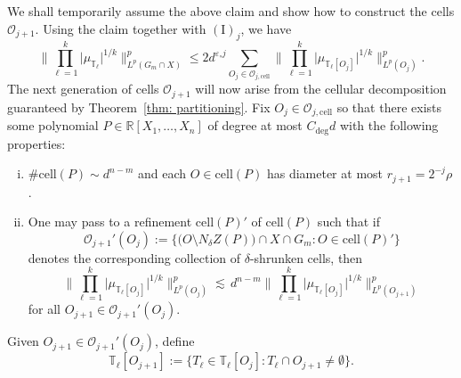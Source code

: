 \documentclass[reqno]{amsart}
\numberwithin{equation}{section}
\newcommand{\R}{\mathbb{R}}
\newcommand{\T}{\mathbb{T}}
\newcommand{\cO}{\mathcal{O}}
\theoremstyle{plain}
\theoremstyle{definition}
\newcommand{\cell}{\mathrm{cell}}
\begin{document}
We shall temporarily assume the above claim and show how to construct the cells $\cO_{j+1}$. Using the claim together with $(\mathrm{I})_j$, we have
 \begin{equation}\label{eq: cellular 1}
   \Big\|\prod_{\ell = 1}^k \big| \mu_{\T_{\ell}}  \big|^{1/k} \Big\|_{L^p(G_m\cap X)}^p \leq 2d^{\varepsilon_{\circ}j} \sum_{O_j \in \cO_{j,\cell}} \Big\|\prod_{\ell = 1}^k \big| \mu_{\T_{\ell}[O_j]} \big|^{1/k} \Big\|_{L^p(O_j)}^p.
\end{equation} 
The next generation of cells $\cO_{j+1}$ will now arise from the cellular decomposition guaranteed by Theorem~\ref{thm: partitioning}. Fix $O_j \in \cO_{j, \cell}$ so that there exists some polynomial $P \in \R[X_1, \dots, X_n]$ of degree at most $C_{\deg} d$ with the following properties:
\begin{enumerate}[i)]
    \item $\#\cell(P) \sim d^{n-m}$ and each $O \in \cell(P)$ has diameter at most $r_{j+1} = 2^{-j} \rho$. 
    \item One may pass to a refinement $\cell(P)'$ of $\cell(P)$ such that if 
    \begin{equation*}
        \cO_{j+1}'(O_j) := \big\{ \big(O\setminus N_{\delta}Z(P)\big) \cap X \cap G_m : O \in \cell(P)'\}
    \end{equation*}
    denotes the corresponding collection of $\delta$-shrunken cells, then 
    \begin{equation*}
    \Big\|\prod_{\ell = 1}^k \big| \mu_{\T_{\ell}[O_j]} \big|^{1/k} \Big\|_{L^p(O_j)}^p \lesssim\, d^{n-m} \Big\|\prod_{\ell = 1}^k \big| \mu_{\T_{\ell}[O_j]} \big|^{1/k} \Big\|_{L^p(O_{j+1})}^p
\end{equation*}
for all $O_{j+1} \in \cO_{j+1}'(O_j)$.
    \end{enumerate}
 Given $O_{j+1} \in \cO_{j+1}'(O_j)$, define
 \begin{equation*}
 \T_{\ell}[O_{j+1}] := \big\{ T_{\ell} \in \T_{\ell}[O_j] : T_{\ell} \cap O_{j+1} \neq \emptyset \big\}.
\end{equation*}
\end{document}
